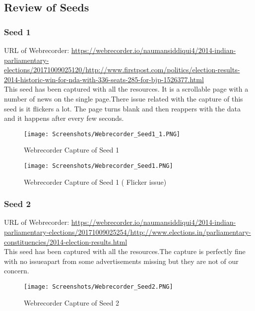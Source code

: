 \documentclass[11pt,journal,compsoc,onecolumn]{IEEEtran}
\begin{document}
\subsection{Review of  Seeds}
\subsubsection{Seed 1}
URL of Webrecorder: 
\url{https://webrecorder.io/naumansiddiqui4/2014-indian-parliamentary-elections/20171009025120/http://www.firstpost.com/politics/election-results-2014-historic-win-for-nda-with-336-seats-285-for-bjp-1526377.html}\\
This seed has been captured with all the resources. It is a scrollable page with a number of news on the single page.There issue related with the capture of this seed is it flickers a lot. The page turns blank and then reappers with the data and it happens after every few seconds.
 \begin{figure}[ht] 
  \centering
  \texttt{[image: Screenshots/Webrecorder\_Seed1\_1.PNG]}
  \caption{Webrecorder Capture of Seed 1}
  \label{fig:2}
\end{figure}
 \begin{figure}[ht] 
  \centering
  \texttt{[image: Screenshots/Webrecorder\_Seed1.PNG]}
  \caption{Webrecorder Capture of Seed 1 ( Flicker issue)}
  \label{fig:3}
\end{figure}
\subsubsection{Seed 2}
URL of Webrecorder: 
\url{https://webrecorder.io/naumansiddiqui4/2014-indian-parliamentary-elections/20171009025254/http://www.elections.in/parliamentary-constituencies/2014-election-results.html}\\
This seed has been captured with all the resources.The capture is perfectly fine with no issueapart from some advertisements missing but they are not of our concern.
 \begin{figure}[ht] 
  \centering
  \texttt{[image: Screenshots/Webrecorder\_Seed2.PNG]}
  \caption{Webrecorder Capture of Seed 2}
  \label{fig:4}
\end{figure}
\end{document}
